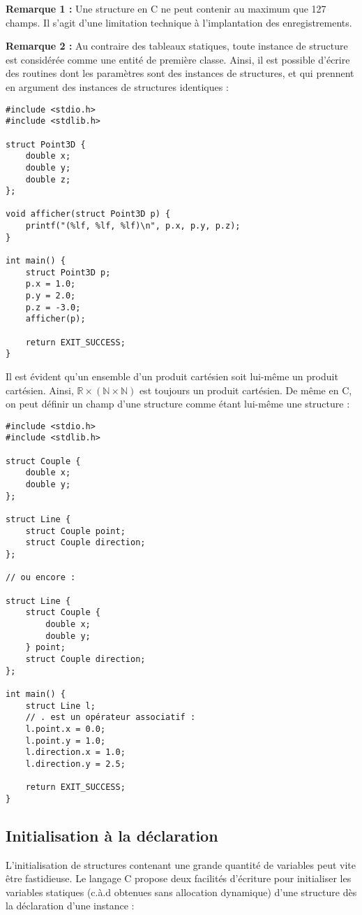 \documentclass[../../../main.tex]{subfiles}
\begin{document}
\textbf{Remarque 1 :} Une structure en C ne peut contenir au maximum que 127 champs. Il s'agit d'une limitation technique à l'implantation des enregistrements.
 
\textbf{Remarque 2 :} Au contraire des tableaux statiques, toute instance de structure est considérée comme une entité de première classe. Ainsi, il est possible d'écrire des routines dont les paramètres sont des instances de structures, et qui prennent en argument des instances de structures identiques :
\begin{verbatim}
#include <stdio.h>
#include <stdlib.h>

struct Point3D {
	double x;
	double y;
	double z;
};

void afficher(struct Point3D p) {
	printf("(%lf, %lf, %lf)\n", p.x, p.y, p.z);
}

int main() {
	struct Point3D p;
	p.x = 1.0;
	p.y = 2.0;
	p.z = -3.0;
	afficher(p);

	return EXIT_SUCCESS;
}
\end{verbatim}
Il est évident qu'un ensemble d'un produit cartésien soit lui-même un produit cartésien. Ainsi, $\mathbb{R}\times{(\mathbb{N}\times{\mathbb{N}})}$ est toujours un produit cartésien.
De même en C, on peut définir un champ d'une structure comme étant lui-même une structure :
\begin{verbatim}
#include <stdio.h>
#include <stdlib.h>

struct Couple {
	double x;
	double y;
};

struct Line {
	struct Couple point;
	struct Couple direction;
};

// ou encore :

struct Line {
	struct Couple {
		double x;
		double y;
	} point;
	struct Couple direction;
};

int main() {
	struct Line l;
	// . est un opérateur associatif :
	l.point.x = 0.0;
	l.point.y = 1.0;
	l.direction.x = 1.0;
	l.direction.y = 2.5;

	return EXIT_SUCCESS;
}
\end{verbatim}
\subsection{Initialisation à la déclaration}
\label{sub:initialisation_la_d_claration}
L'initialisation de structures contenant une grande quantité de variables peut vite être fastidieuse. Le langage C propose deux facilités d'écriture pour initialiser les variables statiques (c.à.d obtenues sans allocation dynamique) d'une structure dès la déclaration d'une instance : 
\end{document}
